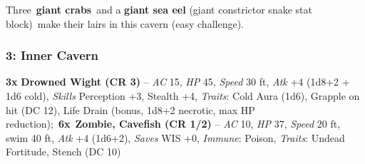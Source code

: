 \documentclass[10pt,twocolumn]{article}
\let\oldtextbf\textbf
\renewcommand{\textbf}[1]{\oldtextbf{{#1}}}
\begin{document}
Three~\textbf{giant crabs}~and a \textbf{giant sea eel} (giant
constrictor snake stat block)~make their lairs in this cavern (easy
challenge).

\subsubsection{3: Inner Cavern}\label{inner-cavern}

\begin{tcolorbox}[
  enhanced,
  breakable,
  colback={encountercolor},
  colframe=black,
  boxrule=1pt,
  coltext=black,
  arc=6pt,
  left=4pt,
  right=4pt,
  top=2pt,
  bottom=2pt,
  boxsep=4pt,
  before skip=10pt,
  after skip=10pt,
  fontupper={\blockquoteFont\small\linespread{0.9}\selectfont\color{black}}
]

\faSkull\hspace{0.8em}\begin{minipage}[t]{\dimexpr\linewidth-1.8em\hangindent=1.8em\hangafter=0}\textbf{3x}
\textbf{Drowned Wight (CR 3)} -- \emph{AC} 15, \emph{HP} 45,
\emph{Speed} 30 ft, \emph{Atk} +4 (1d8+2 + 1d6 cold), \emph{Skills}
Perception +3, Stealth +4, \emph{Traits}: Cold Aura (1d6), Grapple on
hit (DC 12), Life Drain (bonus, 1d8+2 necrotic, max HP
reduction);~\textbf{6x}~\textbf{Zombie, Cavefish (CR 1/2)} -- \emph{AC}
10, \emph{HP} 37, \emph{Speed} 20 ft, swim 40 ft, \emph{Atk} +4 (1d6+2),
\emph{Saves} WIS +0, \emph{Immune}: Poison, \emph{Traits}: Undead
Fortitude, Stench (DC 10)

\end{minipage}\end{tcolorbox}
\end{document}
